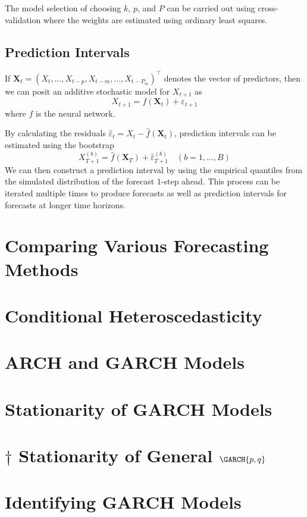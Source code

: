 The model selection of choosing $ k $, $ p $, and $ P $
can be carried out using cross-validation where the weights are estimated using ordinary
least squares.

\subsection*{Prediction Intervals}
If $ \symbf{X}_t=(X_t,\ldots,X_{t-p},X_{t-m},\ldots,X_{t-P_m})^\top $
denotes the vector of predictors, then we can posit an additive stochastic model for
$ X_{t+1} $ as
\[ X_{t+1}=f(\symbf{X}_t)+\varepsilon_{t+1} \]
where $ f $ is the neural network.

By calculating the residuals
$ \hat{\varepsilon}_t=X_t-\hat{f}(\symbf{X}_t) $,
prediction intervals can be estimated using the bootstrap
\[ X_{T+1}^{(b)}=\hat{f}(\symbf{X}_T)+\hat{\varepsilon}_{T+1}^{(b)}\quad(b=1,\ldots,B) \]
We can then construct a prediction interval by using
the empirical quantiles from the simulated distribution of the
forecast $ 1 $-step ahead. This process can be iterated multiple
times to produce forecasts as well as prediction intervals for
forecasts at longer time horizons.

\section{Comparing Various Forecasting Methods}

\section{Conditional Heteroscedasticity}

\section{ARCH and GARCH Models}

\section{Stationarity of GARCH Models}

\section{\texorpdfstring{$ \dagger $}{†} Stationarity of General \texorpdfstring{$ \GARCH{p,q} $}{GARCH(𝑝, 𝑞)}}

\section{Identifying GARCH Models}

